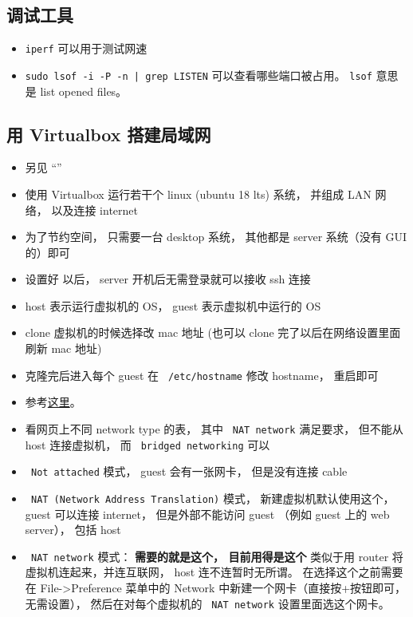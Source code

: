 \subsection{调试工具}
\begin{itemize}
\item \verb`iperf` 可以用于测试网速
\item \verb`sudo lsof -i -P -n | grep LISTEN` 可以查看哪些端口被占用。 \verb`lsof` 意思是 list opened files。
\end{itemize}


\subsection{用 Virtualbox 搭建局域网}\label{sub_LinWeb_1}
\begin{itemize}
\item 另见 “”
\item 使用 Virtualbox 运行若干个 linux (ubuntu 18 lts) 系统， 并组成 LAN 网络， 以及连接 internet
\item 为了节约空间， 只需要一台 desktop 系统， 其他都是 server 系统（没有 GUI 的）即可
\item 设置好  以后， server 开机后无需登录就可以接收 ssh 连接
\item host 表示运行虚拟机的 OS， guest 表示虚拟机中运行的 OS
\item clone 虚拟机的时候选择改 mac 地址 (也可以 clone 完了以后在网络设置里面刷新 mac 地址)
\item 克隆完后进入每个 guest 在 \verb` /etc/hostname` 修改 hostname， 重启即可
\item 参考\href{https://www.thomas-krenn.com/en/wiki/Network_Configuration_in_VirtualBox}{这里}。
\item 看网页上不同 network type 的表， 其中 \verb` NAT network` 满足要求， 但不能从 host 连接虚拟机， 而 \verb` bridged networking` 可以
\item \verb` Not attached` 模式， guest 会有一张网卡， 但是没有连接 cable
\item \verb` NAT (Network Address Translation)` 模式， 新建虚拟机默认使用这个， guest 可以连接 internet， 但是外部不能访问 guest （例如 guest 上的 web server）， 包括 host
\item \verb` NAT network` 模式： \textbf{需要的就是这个， 目前用得是这个} 类似于用 router 将虚拟机连起来，并连互联网， host 连不连暂时无所谓。 在选择这个之前需要在 File->Preference 菜单中的 Network 中新建一个网卡（直接按+按钮即可，无需设置）， 然后在对每个虚拟机的 \verb` NAT network` 设置里面选这个网卡。

\end{itemize}
